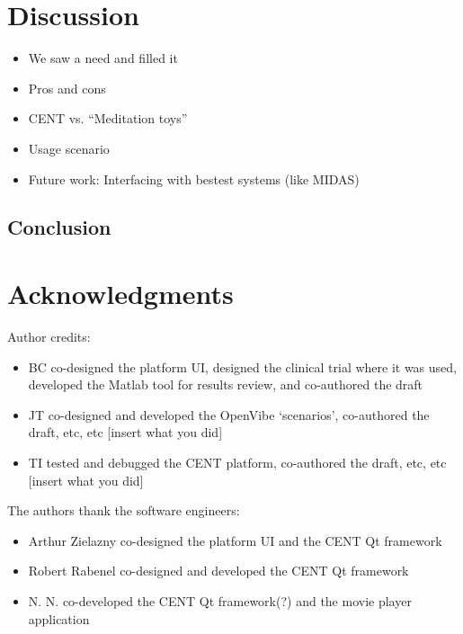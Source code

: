 \documentclass[fleqn,10pt]{wlpeerj}
\begin{document}




\section{Discussion}
\label{disc}
\begin{itemize}
	\item We saw a need and filled it
	\item Pros and cons
	\item CENT vs. “Meditation toys”
	\item Usage scenario
	\item Future work: Interfacing with bestest systems (like MIDAS)
\end{itemize}
\lipsum[10] %





\subsection{Conclusion}

\lipsum[11] %








\section*{Acknowledgments}

Author credits:
\begin{itemize}
	\item BC co-designed the platform UI, designed the clinical trial where it was used, developed the Matlab tool for results review, and co-authored the draft
	
	\item JT co-designed and developed the OpenVibe ‘scenarios’, co-authored the draft, etc, etc [insert what you did]
	
	\item TI tested and debugged the CENT platform, co-authored the draft, etc, etc [insert what you did]
	
\end{itemize}

The authors thank the software engineers:
\begin{itemize}
	\item Arthur Zielazny co-designed the platform UI and the CENT Qt framework

	\item Robert Rabenel co-designed and developed the CENT Qt framework

	\item N. N. co-developed the CENT Qt framework(?) and the movie player application

\end{itemize}
\end{document}

